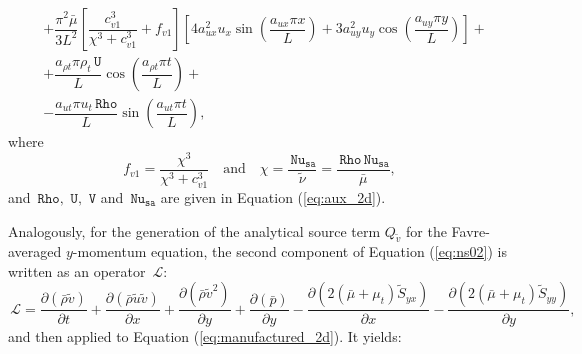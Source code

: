 \documentclass[10pt]{article}
\newcommand{\Diff}[2] {\dfrac{\partial( #1)}{\partial #2}}
\newcommand{\Rho}{\,\mathtt{Rho}}
\newcommand{\U}{\,\mathtt{U}}
\newcommand{\V}{\,\mathtt{V}}
\newcommand{\Nu}{\,\mathtt{Nu_{sa}}}
\newcommand{\Lo}{\,\mathcal{L}}
\newcommand{\brho}{\bar{\rho}}
\newcommand{\bp}{\bar{p}}
\newcommand{\tu}{\tilde{u}}
\newcommand{\tv}{\tilde{v}}
\newcommand{\tS}{\tilde{S}}
\newcommand{\bmu}{\bar{\mu}}
\begin{document}
\begin{equation}
\begin{split}
&+\dfrac{\pi^2 \bmu}{3L^2}\left[\dfrac{c_{v1}^3 }{ \chi^3+c_{v1}^3} +f_{v1}\right]\left[4 a_{ux}^2 u_x  \sin\left(\dfrac{a_{ux} \pi x}{L}\right)+3 a_{uy}^2 u_y  \cos\left(\dfrac{a_{uy} \pi y}{L}\right)\right] +\\
&+\dfrac{a_{\rho t} \pi \rho_t \U  }{L}\cos\left(\dfrac{a_{\rho t} \pi t}{L}\right)+ \\
&-\dfrac{a_{ut} \pi u_t \Rho  }{L}\sin\left(\dfrac{a_{ut} \pi t}{L}\right),
 \end{split}
\end{equation}
where
\begin{equation}\label{eq:chi}
  f_{v1} = \dfrac{\chi^3}{\chi^3+c_{v1}^3}\quad \mbox{and}\quad \chi =\dfrac{\Nu}{\tilde{\nu}} =\dfrac{\Rho \Nu}{\bmu},
\end{equation}
and $\Rho,\,\U,\,\V$ and $\Nu$ are given in Equation (\ref{eq:aux_2d}).


Analogously, for the generation of the analytical source term $Q_{\tv}$ for the Favre-averaged $y$-momentum equation, the second component of Equation  (\ref{eq:ns02})  is written as an  operator $\Lo$:
\begin{equation*}
 \Lo =\Diff{\brho \tv}{t} +\Diff{\brho \tu\tv}{x}+\Diff{\brho \tv^2}{y} +\Diff{\bp}{y}-\Diff{2(\bmu+\mu_t)\tS_{yx}}{x}-\Diff{2(\bmu+\mu_t)\tS_{yy}}{y},
\end{equation*}
and then applied to Equation  (\ref{eq:manufactured_2d}). It yields:
\end{document}
